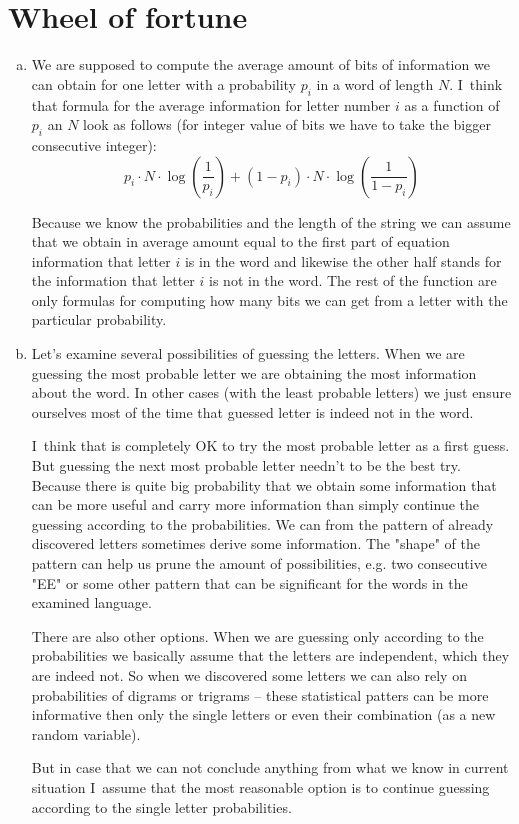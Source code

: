 \documentclass[a4paper,10pt]{article}
\begin{document}
\section*{Wheel of fortune}
\begin{enumerate}[a)]
\item
We are supposed to compute the average amount of bits of information we can obtain for one letter with a probability $p_i$  in a word of length $N$. I~think that formula for the average information for letter number $i$ as a function of $p_i$ an $N$ look as follows (for integer value of bits we have to take the bigger consecutive integer):
$$
 p_i \cdot N \cdot \log\left(\frac{1}{p_i}\right) + (1-p_i)\cdot N \cdot \log\left(\frac{1}{1-p_i}\right)
$$

Because we know the probabilities and the length of the string we can assume that we obtain in average amount equal to the first part of equation information that letter $i$ is in the word and likewise the other half stands for the information that letter $i$ is not in the word. The rest of the function are only formulas for computing how many bits we can get from a letter with the particular probability.

\item Let's examine several possibilities of guessing the letters. When we are guessing the most probable letter we are obtaining the most information about the word. In other cases (with the least probable letters) we just ensure ourselves most of the time that guessed letter is indeed not in the word. 

I~think that is completely OK to try the most probable letter as a first guess. But guessing the next most probable letter needn't to be the best try. Because there is quite big probability that we obtain some information that can be more useful and carry more information than simply continue the guessing according to the probabilities.
We can from the pattern of already discovered letters sometimes derive some information. The "shape" of the pattern can help us prune the amount of possibilities, e.g. two consecutive "EE" or some other pattern that can be significant for the words in the examined language.

There are also other options. When we are guessing only according to the probabilities we basically assume that the letters are independent, which they are indeed not. So when we discovered some letters we can also rely on probabilities of digrams or trigrams -- these statistical patters can be more informative then only the single letters or even their combination (as a new random variable).

But in case that we can not conclude anything from what we know in current situation I~assume that the most reasonable option is to continue guessing according to the single letter probabilities.
\end{enumerate}
\end{document}
